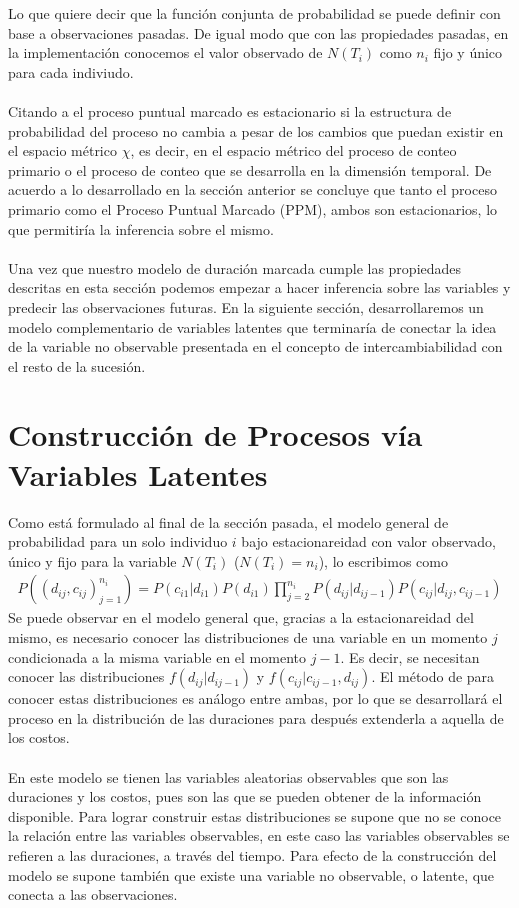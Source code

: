 Lo que quiere decir que la funci\'on conjunta de probabilidad se puede definir con base a observaciones pasadas. De igual modo que con las propiedades pasadas, en la implementaci\'on conocemos el valor observado de $N(T_i)$ como $n_i$ fijo y \'unico para cada indiviudo. \\
\\
Citando a \cite{daley2003} el proceso puntual marcado es estacionario si la estructura de probabilidad del proceso no cambia a pesar de los cambios que puedan existir en el espacio m\'etrico $\chi$, es decir, en el espacio m\'etrico del proceso de conteo primario o el proceso de conteo que se desarrolla en la dimensi\'on temporal. De acuerdo a lo desarrollado en la secci\'on anterior se concluye que tanto el proceso primario como el Proceso Puntual Marcado (PPM), ambos son estacionarios, lo que permitir\'ia la inferencia sobre el mismo.\\
\\
Una vez que nuestro modelo de duraci\'on marcada cumple las propiedades descritas en esta secci\'on podemos empezar a hacer inferencia sobre las variables y predecir las observaciones futuras. En la siguiente secci\'on, desarrollaremos un modelo complementario de variables latentes que terminar\'ia de conectar la idea de la variable no observable presentada en el concepto de intercambiabilidad con el resto de la sucesi\'on.

\section{Construcci\'on de Procesos v\'ia Variables Latentes}
Como est\'a formulado al final de la secci\'on pasada, el modelo general de probabilidad para un solo individuo $i$ bajo estacionareidad con valor observado, \'unico y fijo para la variable $N(T_i)$ ($N(T_i)=n_i$), lo escribimos como
\begin{align*}
P((d_{ij},c_{ij})_{j=1}^{n_i})= P(c_{i1}|d_{i1})P(d_{i1}) \prod_{j=2}^{n_i} P(d_{ij}|d_{ij-1})P(c_{ij}|d_{ij},c_{ij-1})
\end{align*}
Se puede observar en el modelo general que, gracias a la estacionareidad del mismo, es necesario conocer las distribuciones de una variable en un momento $j$ condicionada a la misma variable en el momento $j-1$. Es decir, se necesitan conocer las distribuciones $f(d_{ij}|d_{ij-1})$ y $f(c_{ij}|c_{ij-1},d_{ij})$. El m\'etodo de para conocer estas distribuciones es an\'alogo entre ambas, por lo que se desarrollar\'a el proceso en la distribuci\'on de las duraciones para despu\'es extenderla a aquella de los costos.\\
\\
En este modelo se tienen las variables aleatorias observables que son las duraciones y los costos, pues son las que se pueden obtener de la informaci\'on disponible. Para lograr construir estas distribuciones se supone que no se conoce la relaci\'on entre las variables observables, en este caso las variables observables se refieren a las duraciones, a trav\'es del tiempo. Para efecto de la construcci\'on del modelo se supone tambi\'en que existe una variable no observable, o latente, que conecta a las observaciones.

